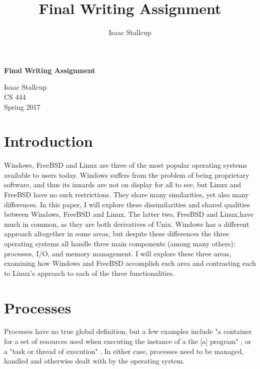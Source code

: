 \documentclass[10pt,draftclsnofoot,onecolumn,compsoc]{IEEEtran}
\author{Isaac Stallcup}
\title{Final Writing Assignment}
\begin{document}
	
	\begin{titlepage}
		
		\begin{center}

		\fontsize{20pt}{20pt}\selectfont
				
		\vspace*{3.5cm}
	
		\textbf{Final Writing Assignment}\\
		
		\vspace{0.5cm}
		
		\fontsize{16pt}{16pt}\selectfont
		
		Isaac Stallcup \\
		CS 444\\
		Spring 2017\\
		

		\end{center}
	
	\end{titlepage}

	\section{Introduction}
	Windows, FreeBSD and Linux are three of the most popular operating systems available to users today. Windows suffers from the problem of being proprietary software, and thus its innards are not on display for all to see, but Linux and FreeBSD have no such restrictions. They share many similarities, yet also many differences. In this paper, I will explore these dissimilarities and shared qualities between Windows, FreeBSD and Linux. The latter two, FreeBSD and Linux,have much in common, as they are both derivatives of Unix\texttrademark. Windows has a different approach altogether in some areas, but despite these differences the three operating systems all handle three main components (among many others): processes, I/O, and memory management. I will explore these three areas, examining how Windows and FreeBSD accomplish each area and contrasting each to Linux's approach to each of the three functionalities.
%	
	\section{Processes}
	
	Processes have no true global definition, but a few examples include "a container for a set of resources used when executing the instance of a the [a] program" \cite{WInternals}, or a "task or thread of execution" \cite{BSD}. In either case, processes need to be managed, handled and otherwise dealt with by the operating system.
	
\end{document}
